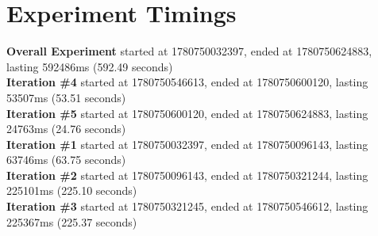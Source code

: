 \documentclass{article}
\begin{document}
\section*{Experiment Timings}
\textbf{Overall Experiment} started at 1780750032397, ended at 1780750624883, lasting 592486ms (592.49 seconds)
\\\textbf{Iteration \#4} started at 1780750546613, ended at 1780750600120, lasting 53507ms (53.51 seconds)
\\\textbf{Iteration \#5} started at 1780750600120, ended at 1780750624883, lasting 24763ms (24.76 seconds)
\\\textbf{Iteration \#1} started at 1780750032397, ended at 1780750096143, lasting 63746ms (63.75 seconds)
\\\textbf{Iteration \#2} started at 1780750096143, ended at 1780750321244, lasting 225101ms (225.10 seconds)
\\\textbf{Iteration \#3} started at 1780750321245, ended at 1780750546612, lasting 225367ms (225.37 seconds)
\end{document}
